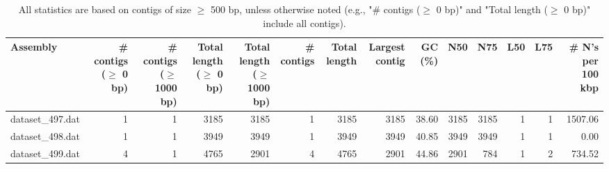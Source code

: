 \documentclass[12pt,a4paper]{article}
\begin{document}
\begin{table}[ht]
\begin{center}
\caption{All statistics are based on contigs of size $\geq$ 500 bp, unless otherwise noted (e.g., "\# contigs ($\geq$ 0 bp)" and "Total length ($\geq$ 0 bp)" include all contigs).}
\begin{tabular}{|l*{13}{|r}|}
\hline
Assembly & \# contigs ($\geq$ 0 bp) & \# contigs ($\geq$ 1000 bp) & Total length ($\geq$ 0 bp) & Total length ($\geq$ 1000 bp) & \# contigs & Total length & Largest contig & GC (\%) & N50 & N75 & L50 & L75 & \# N's per 100 kbp \\ \hline
dataset\_497.dat & 1 & 1 & 3185 & 3185 & 1 & 3185 & 3185 & 38.60 & 3185 & 3185 & 1 & 1 & 1507.06 \\ \hline
dataset\_498.dat & 1 & 1 & 3949 & 3949 & 1 & 3949 & 3949 & 40.85 & 3949 & 3949 & 1 & 1 & 0.00 \\ \hline
dataset\_499.dat & 4 & 1 & 4765 & 2901 & 4 & 4765 & 2901 & 44.86 & 2901 & 784 & 1 & 2 & 734.52 \\ \hline
\end{tabular}
\end{center}
\end{table}
\end{document}
